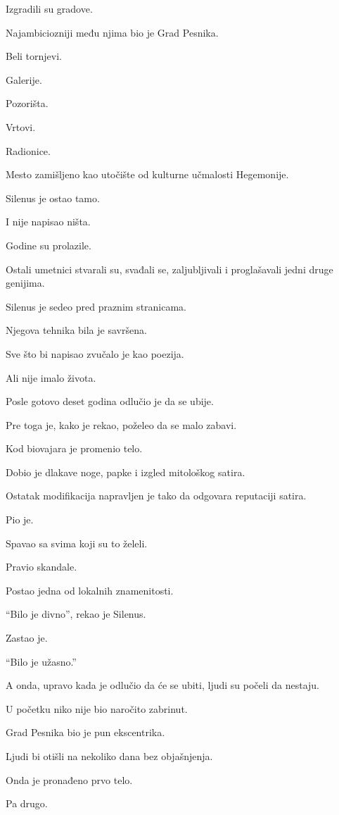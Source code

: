 Izgradili su gradove.

Najambiciozniji među njima bio je Grad Pesnika.

Beli tornjevi.

Galerije.

Pozorišta.

Vrtovi.

Radionice.

Mesto zamišljeno kao utočište od kulturne učmalosti Hegemonije.

Silenus je ostao tamo.

I nije napisao ništa.

Godine su prolazile.

Ostali umetnici stvarali su, svađali se, zaljubljivali i proglašavali jedni druge genijima.

Silenus je sedeo pred praznim stranicama.

Njegova tehnika bila je savršena.

Sve što bi napisao zvučalo je kao poezija.

Ali nije imalo života.

Posle gotovo deset godina odlučio je da se ubije.

Pre toga je, kako je rekao, poželeo da se malo zabavi.

Kod biovajara je promenio telo.

Dobio je dlakave noge, papke i izgled mitološkog satira.

Ostatak modifikacija napravljen je tako da odgovara reputaciji satira.

Pio je.

Spavao sa svima koji su to želeli.

Pravio skandale.

Postao jedna od lokalnih znamenitosti.

``Bilo je divno'', rekao je Silenus.

Zastao je.

``Bilo je užasno.''

A onda, upravo kada je odlučio da će se ubiti, ljudi su počeli da nestaju.

\bigskip

U početku niko nije bio naročito zabrinut.

Grad Pesnika bio je pun ekscentrika.

Ljudi bi otišli na nekoliko dana bez objašnjenja.

Onda je pronađeno prvo telo.

Pa drugo.

